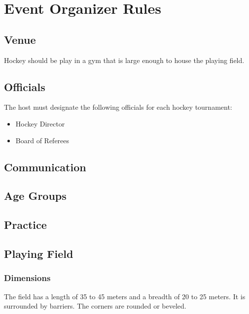 \chapter{Event Organizer Rules}

\section{Venue}

Hockey should be play in a gym that is large enough to house the playing field.
\section{Officials}

The host must designate the following officials for each hockey tournament:
\begin{itemize}
\item Hockey Director
\item Board of Referees
\end{itemize}

\begin{comment-2016}

\section{Communication}

\section{Age Groups}

\section{Practice}

\end{comment-2016}

\section{Playing Field}

\subsection{Dimensions}



The field has a length of 35 to 45 meters and a breadth of 20 to 25 meters.
It is surrounded by barriers.
The corners are rounded or beveled.

